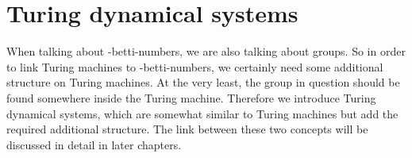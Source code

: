 \section{Turing dynamical systems}
\label{tds}

When talking about \ltwo-betti-numbers, we are also talking about groups.
So in order to link Turing machines to \ltwo-betti-numbers, we certainly need some additional structure on Turing machines.
At the very least, the group in question should be found somewhere inside the Turing machine.
Therefore we introduce Turing dynamical systems, which are somewhat similar to Turing machines but add the required additional structure.
The link between these two concepts will be discussed in detail in later chapters.








